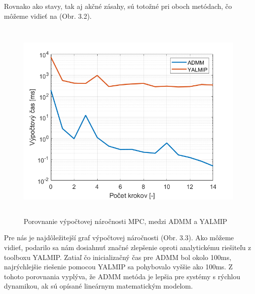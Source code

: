 Rovnako ako stavy, tak aj akčné zásahy, sú totožné pri oboch metódach, čo môžeme vidieť na (Obr. 3.2).
\newpage
\begin{figure}[H]
	\centering
	\includegraphics[width=13cm,height=10cm]{images/Hmotny_bod/Vypoctovy_cas}
	\caption{Porovnanie výpočtovej náročnosti MPC, medzi ADMM a YALMIP}
	\label{fig3: VNAA}
\end{figure}
Pre nás je najdôležitejší graf výpočtovej náročnosti (Obr. 3.3). Ako môžeme vidieť, podarilo sa nám dosiahnuť značné zlepšenie oproti analytickému riešiteľu z toolboxu YALMIP. Zatiaľ čo inicializačný čas pre ADMM bol okolo 100ms, najrýchlejšie riešenie pomocou YALMIP sa pohybovalo vyššie ako 100ms. Z tohoto porovnania vyplýva, že ADMM metóda je lepšia pre systémy s rýchlou dynamikou, ak sú opísané lineárnym matematickým modelom. 
\newpage